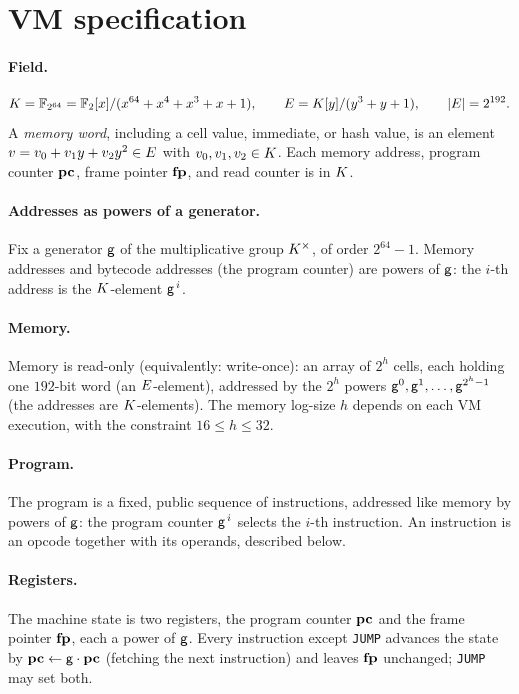 \section{VM specification}\label{sec:vm}

\paragraph{Field.}
\[
  K=\mathbb{F}_{2^{64}}=\mathbb{F}_2[x]/(x^{64}+x^4+x^3+x+1),
  \qquad
  E=K[y]/(y^3+y+1),
  \qquad |E|=2^{192}.
\]
A \emph{memory word}, including a cell value, immediate, or hash value, is an element $v=v_0+v_1y+v_2y^2\in E$ with $v_0,v_1,v_2\in K$. Each memory address, program counter $\mathbf{pc}$, frame pointer $\mathbf{fp}$, and read counter is in $K$.

\paragraph{Addresses as powers of a generator.} Fix a generator $\mathsf{g}$ of the multiplicative group $K^{\times}$, of order $2^{64}-1$. Memory addresses and bytecode addresses (the program counter) are powers of $\mathsf{g}$: the $i$-th address is the $K$-element $\mathsf{g}^{\,i}$.

\paragraph{Memory.} Memory is read-only (equivalently: write-once): an array of $2^{h}$ cells, each holding one $192$-bit word (an $E$-element), addressed by the $2^{h}$ powers $\mathsf{g}^{0},\mathsf{g}^{1},\dots,\mathsf{g}^{2^{h}-1}$ (the addresses are $K$-elements). The memory log-size $h$ depends on each VM execution, with the constraint $16\le h\le 32$.

\paragraph{Program.} The program is a fixed, public sequence of instructions, addressed like memory by powers of $\mathsf{g}$: the program counter $\mathsf{g}^{\,i}$ selects the $i$-th instruction. An instruction is an opcode together with its operands, described below.

\paragraph{Registers.} The machine state is two registers, the program counter $\mathbf{pc}$ and the frame pointer $\mathbf{fp}$, each a power of $\mathsf{g}$. Every instruction except \texttt{JUMP} advances the state by $\mathbf{pc}\gets\mathsf{g}\cdot\mathbf{pc}$ (fetching the next instruction) and leaves $\mathbf{fp}$ unchanged; \texttt{JUMP} may set both.

